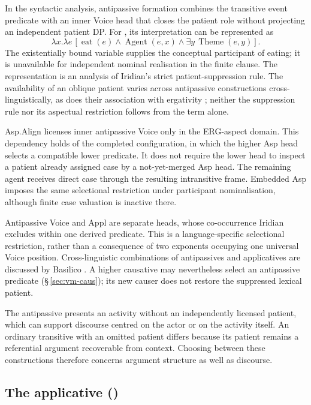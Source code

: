 In the syntactic analysis, antipassive formation combines the transitive event predicate with an inner
Voice head that closes the patient role without projecting an independent
patient DP. For , its interpretation can be represented as
\[
 \lambda x.\lambda e\,[\operatorname{eat}(e)\land
 \operatorname{Agent}(e,x)\land
 \exists y\,\operatorname{Theme}(e,y)].
\]
The existentially bound variable supplies the conceptual participant of eating;
it is unavailable for independent nominal realisation in the finite clause.
The representation is an analysis of Iridian's strict patient-suppression rule.
The availability of an oblique patient varies across antipassive constructions
cross-linguistically, as does their association with ergativity
\cite{heaton2020}; neither the suppression rule nor its aspectual restriction
follows from the term  alone.

Asp.Align licenses inner antipassive Voice only in the ERG-aspect domain.
This dependency holds of the completed configuration, in which the higher Asp
head selects a compatible lower predicate. It does not require the lower head
to inspect a patient already assigned case by a not-yet-merged Asp head. The
remaining agent receives direct case through the resulting intransitive frame.
Embedded Asp imposes the same selectional restriction under participant
nominalisation, although finite case valuation is inactive there.

Antipassive Voice and Appl are separate heads, whose co-occurrence Iridian
excludes within one derived predicate. This is a language-specific selectional
restriction, rather than a consequence of two exponents occupying one universal
Voice position. Cross-linguistic combinations of antipassives and applicatives
are discussed by Basilico \cite[ch.~5]{basilico2026}. A higher causative may nevertheless select an antipassive
predicate (§\,\ref{sec:vm-caus}); its new causer does not restore the
suppressed lexical patient.

The antipassive presents an activity without an independently licensed patient,
which can support discourse centred on the actor or on the activity itself.
An ordinary transitive with an omitted patient differs because its patient
remains a referential argument recoverable from context. Choosing between these
constructions therefore concerns argument structure as well as discourse.

\subsection{The applicative ()}\label{sec:vm-appl}

